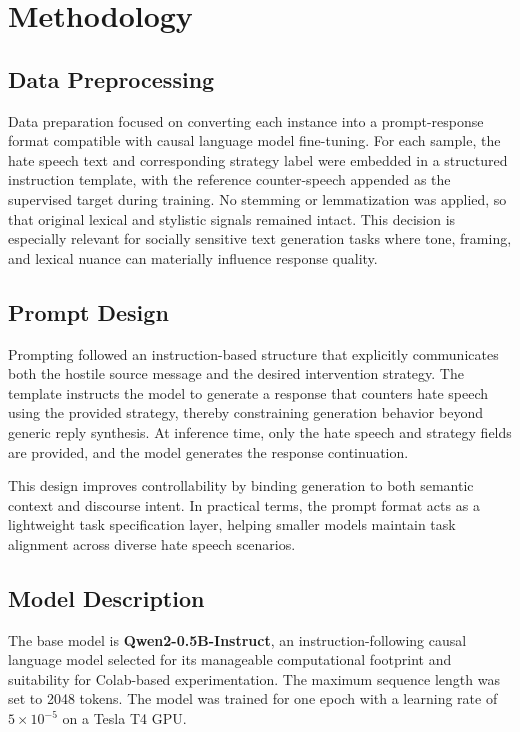 \documentclass[11pt]{article}
\begin{document}
\section{Methodology}
\subsection{Data Preprocessing}
Data preparation focused on converting each instance into a prompt-response format compatible with causal language model fine-tuning. For each sample, the hate speech text and corresponding strategy label were embedded in a structured instruction template, with the reference counter-speech appended as the supervised target during training. No stemming or lemmatization was applied, so that original lexical and stylistic signals remained intact. This decision is especially relevant for socially sensitive text generation tasks where tone, framing, and lexical nuance can materially influence response quality.

\subsection{Prompt Design}
Prompting followed an instruction-based structure that explicitly communicates both the hostile source message and the desired intervention strategy. The template instructs the model to generate a response that counters hate speech using the provided strategy, thereby constraining generation behavior beyond generic reply synthesis. At inference time, only the hate speech and strategy fields are provided, and the model generates the response continuation.

This design improves controllability by binding generation to both semantic context and discourse intent. In practical terms, the prompt format acts as a lightweight task specification layer, helping smaller models maintain task alignment across diverse hate speech scenarios.

\subsection{Model Description}
The base model is \textbf{Qwen2-0.5B-Instruct}, an instruction-following causal language model selected for its manageable computational footprint and suitability for Colab-based experimentation. The maximum sequence length was set to 2048 tokens. The model was trained for one epoch with a learning rate of \(5 \times 10^{-5}\) on a Tesla T4 GPU.
\end{document}
